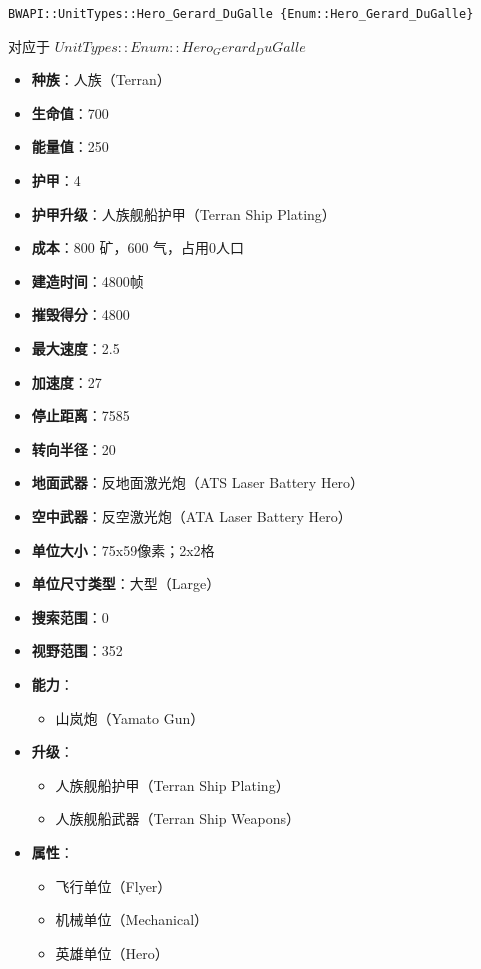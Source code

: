 \begin{tcolorbox}[colback=white, colframe=black!60!white, title=Hero\_Gerard\_DuGalle(), arc=0mm]
    \begin{verbatim}
BWAPI::UnitTypes::Hero_Gerard_DuGalle {Enum::Hero_Gerard_DuGalle}
    \end{verbatim}
    对应于  $ UnitTypes::Enum::Hero_Gerard_DuGalle $ 
    \begin{itemize}
        \item \textbf{种族}：人族（Terran）
        \item \textbf{生命值}：700
        \item \textbf{能量值}：250
        \item \textbf{护甲}：4
        \item \textbf{护甲升级}：人族舰船护甲（Terran Ship Plating）
        \item \textbf{成本}：800 矿，600 气，占用0人口
        \item \textbf{建造时间}：4800帧
        \item \textbf{摧毁得分}：4800
        \item \textbf{最大速度}：2.5
        \item \textbf{加速度}：27
        \item \textbf{停止距离}：7585
        \item \textbf{转向半径}：20
        \item \textbf{地面武器}：反地面激光炮（ATS Laser Battery Hero）
        \item \textbf{空中武器}：反空激光炮（ATA Laser Battery Hero）
        \item \textbf{单位大小}：75x59像素；2x2格
        \item \textbf{单位尺寸类型}：大型（Large）
        \item \textbf{搜索范围}：0
        \item \textbf{视野范围}：352
        \item \textbf{能力}：
            \begin{itemize}
                \item 山岚炮（Yamato Gun）
            \end{itemize}
        \item \textbf{升级}：
            \begin{itemize}
                \item 人族舰船护甲（Terran Ship Plating）
                \item 人族舰船武器（Terran Ship Weapons）
            \end{itemize}
        \item \textbf{属性}：
            \begin{itemize}
                \item 飞行单位（Flyer）
                \item 机械单位（Mechanical）
                \item 英雄单位（Hero）
            \end{itemize}
    \end{itemize}
    
\end{tcolorbox}


